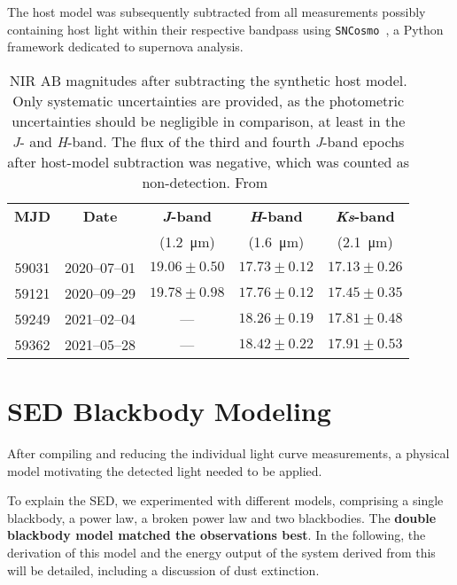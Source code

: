 The host model was subsequently subtracted from all measurements possibly containing host light within their respective bandpass using \texttt{SNCosmo}~, a Python framework dedicated to supernova analysis.

\begin{table}
    \centering
    \begin{tabular}{c c c c  c}
        \textbf{MJD} & \textbf{Date} & \textbf{\textit{J}-band} & \textbf{\textit{H}-band} & \textbf{\textit{Ks}-band} \\
                     &               & (\SI{1.2}{\micro\m})     & (\SI{1.6}{\micro\m})     & (\SI{2.1}{\micro\m})      \\
        \hline
        59031        & 2020--07--01  & $19.06 \pm 0.50$         & $ 17.73 \pm 0.12$        & $17.13 \pm 0.26$          \\
        59121        & 2020--09--29  & $19.78 \pm 0.98$         & $ 17.76 \pm 0.12$        & $17.45 \pm 0.35$          \\
        59249        & 2021--02--04  & ---                      & $ 18.26 \pm 0.19$        & $17.81 \pm 0.48$          \\
        59362        & 2021--05--28  & ---                      & $ 18.42 \pm 0.22$        & $17.91 \pm 0.53$          \\
    \end{tabular}
    \caption[NIR magnitudes]{NIR AB magnitudes after subtracting the synthetic host model. Only systematic uncertainties are provided, as the photometric uncertainties should be negligible in comparison, at least in the \textit{J}- and \textit{H}-band. The flux of the third and fourth \textit{J}-band epochs after host-model subtraction was negative, which was counted as non-detection. From~\cite{Reusch2022}}\label{tab:p200_nir}
\end{table}

\section{SED Blackbody Modeling}
After compiling and reducing the individual light curve measurements, a physical model motivating the detected light needed to be applied.

To explain the SED, we experimented with different models, comprising a single blackbody, a power law, a broken power law and two blackbodies. The \textbf{double blackbody model matched the observations best}. In the following, the derivation of this model and the energy output of the system derived from this will be detailed, including a discussion of dust extinction.

